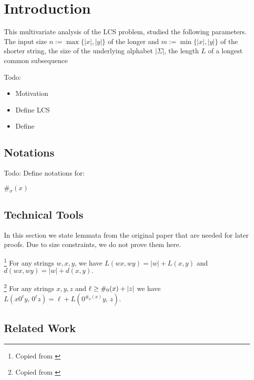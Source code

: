 \section{Introduction}

This multivariate analysis of the LCS problem, studied the following parameters.
The input size $n := \max\{|x|, |y|\}$ of the longer and $m := \min\{|x|, |y|\}$ of the shorter string, the size of the underlying alphabet $|\Sigma|$, the length $L$ of a longest common subsequence



Todo:

\begin{itemize}
\item Motivation
\item Define LCS
\item Define \uovh{}
\end{itemize}


\subsection{Notations}
Todo: Define notations for:

$\#_\sigma(x)$


\subsection{Technical Tools}
In this section we state lemmata from the original paper that are needed for later proofs.
Due to size constraints, we do not prove them here.

\begin{lemma}\footnote{Copied from \cite[Lemma 7.1]{Bringman.2018}}
\label{lem:greedy_prefix_match}
For any strings $w, x, y$, we have
\(
L(wx, wy) = |w| + L(x, y)
\)
and
\(
d(wx, wy) = |w| + d(x, y).
\)
\end{lemma}

\begin{lemma}\footnote{Copied from \cite[Lemma 7.6]{Bringman.2018}}
\label{lem:guards}
For any strings $x, y, z$ and $\ell \geq \#_{0}(x) + |z|$ we have
\(
L\left(x0^{\ell}y,\,0^{\ell}z\right) = \ell + L\left(0^{\#_{0}(x)}y,\,z\right).
\)
\end{lemma}

\subsection{Related Work}

